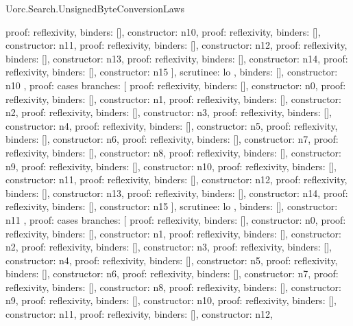 \begin{lexlean}{Uorc.Search.UnsignedByteConversionLaws}
\begin{semanticmodule}
{{{{            {proof: reflexivity{}, binders: [], constructor: n10},
            {proof: reflexivity{}, binders: [], constructor: n11},
            {proof: reflexivity{}, binders: [], constructor: n12},
            {proof: reflexivity{}, binders: [], constructor: n13},
            {proof: reflexivity{}, binders: [], constructor: n14},
            {proof: reflexivity{}, binders: [], constructor: n15}
          ],
          scrutinee: lo
        },
        binders: [],
        constructor: n10
      },
      {
        proof: cases{
          branches: [
            {proof: reflexivity{}, binders: [], constructor: n0},
            {proof: reflexivity{}, binders: [], constructor: n1},
            {proof: reflexivity{}, binders: [], constructor: n2},
            {proof: reflexivity{}, binders: [], constructor: n3},
            {proof: reflexivity{}, binders: [], constructor: n4},
            {proof: reflexivity{}, binders: [], constructor: n5},
            {proof: reflexivity{}, binders: [], constructor: n6},
            {proof: reflexivity{}, binders: [], constructor: n7},
            {proof: reflexivity{}, binders: [], constructor: n8},
            {proof: reflexivity{}, binders: [], constructor: n9},
            {proof: reflexivity{}, binders: [], constructor: n10},
            {proof: reflexivity{}, binders: [], constructor: n11},
            {proof: reflexivity{}, binders: [], constructor: n12},
            {proof: reflexivity{}, binders: [], constructor: n13},
            {proof: reflexivity{}, binders: [], constructor: n14},
            {proof: reflexivity{}, binders: [], constructor: n15}
          ],
          scrutinee: lo
        },
        binders: [],
        constructor: n11
      },
      {
        proof: cases{
          branches: [
            {proof: reflexivity{}, binders: [], constructor: n0},
            {proof: reflexivity{}, binders: [], constructor: n1},
            {proof: reflexivity{}, binders: [], constructor: n2},
            {proof: reflexivity{}, binders: [], constructor: n3},
            {proof: reflexivity{}, binders: [], constructor: n4},
            {proof: reflexivity{}, binders: [], constructor: n5},
            {proof: reflexivity{}, binders: [], constructor: n6},
            {proof: reflexivity{}, binders: [], constructor: n7},
            {proof: reflexivity{}, binders: [], constructor: n8},
            {proof: reflexivity{}, binders: [], constructor: n9},
            {proof: reflexivity{}, binders: [], constructor: n10},
            {proof: reflexivity{}, binders: [], constructor: n11},
            {proof: reflexivity{}, binders: [], constructor: n12},
}}}}
\end{semanticmodule}
\end{lexlean}
